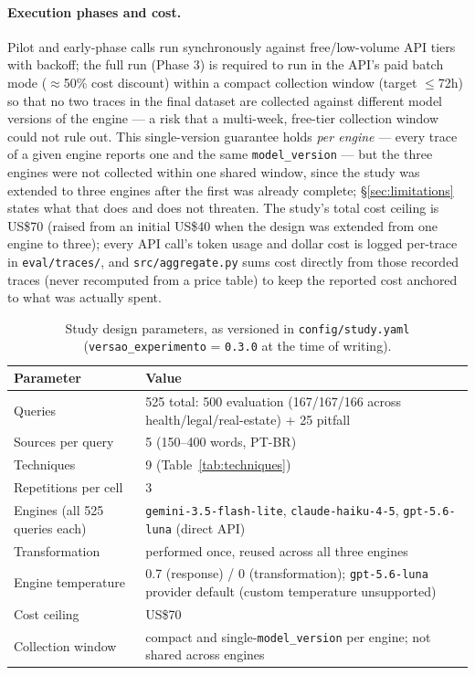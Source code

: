 \documentclass[11pt,a4paper]{article}
\begin{document}
\paragraph{Execution phases and cost.} Pilot and early-phase calls run
synchronously against free/low-volume API tiers with backoff; the full run
(Phase 3) is required to run in the API's paid batch mode ($\approx$50\%
cost discount) within a compact collection window (target $\le$72h) so that
no two traces in the final dataset are collected against different model
versions of the engine --- a risk that a multi-week, free-tier collection
window could not rule out. This single-version guarantee holds \emph{per
engine} --- every trace of a given engine reports one and the same
\texttt{model\_version} --- but the three engines were not collected within
one shared window, since the study was extended to three engines after the
first was already complete; \S\ref{sec:limitations} states what that does
and does not threaten. The study's total cost ceiling is US\$70 (raised
from an initial US\$40 when the design was extended from one engine to
three); every API call's token
usage and dollar cost is logged per-trace in \texttt{eval/traces/}, and
\texttt{src/aggregate.py} sums cost directly from those recorded traces
(never recomputed from a price table) to keep the reported cost anchored to
what was actually spent.

\begin{table}[htbp]
\centering
\small
\begin{tabular}{ll}
\toprule
\textbf{Parameter} & \textbf{Value} \\
\midrule
Queries & 525 total: 500 evaluation (167/167/166 across
  health/legal/real-estate) + 25 pitfall \\
Sources per query & 5 (150--400 words, PT-BR) \\
Techniques & 9 (Table~\ref{tab:techniques}) \\
Repetitions per cell & 3 \\
Engines (all 525 queries each) & \texttt{gemini-3.5-flash-lite},
  \texttt{claude-haiku-4-5}, \texttt{gpt-5.6-luna} (direct API) \\
Transformation & performed once, reused across all three engines \\
Engine temperature & 0.7 (response) / 0 (transformation); \texttt{gpt-5.6-luna}
  provider default (custom temperature unsupported) \\
Cost ceiling & US\$70 \\
Collection window & compact and single-\texttt{model\_version} per engine;
  not shared across engines \\
\bottomrule
\end{tabular}
\caption{Study design parameters, as versioned in \texttt{config/study.yaml}
(\texttt{versao\_experimento} = \texttt{0.3.0} at the time of writing).}
\label{tab:setup}
\end{table}
\end{document}
